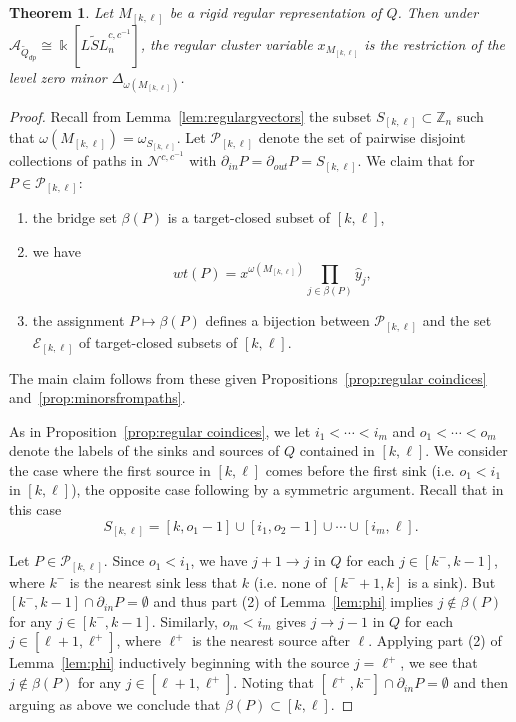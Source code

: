 \documentclass[12pt]{amsart}
\newcommand{\cA}{\mathcal{A}}
\newcommand{\ZZ}{\mathbb{Z}}
\newcommand{\kk}{\Bbbk}
\newcommand{\gv}{\omega}
\newcommand{\grep}{\gv}
\newcommand{\cE}{\mathcal{E}}
\newcommand{\cN}{\mathcal{N}} %
\newcommand{\cP}{\mathcal{P}}
\newcommand{\Qdp}{\widetilde{Q}_{dp}}
\newcommand{\Qrep}{M}
\newtheorem{theorem}{Theorem}[section]
\theoremstyle{remark}
\numberwithin{equation}{section}
\numberwithin{figure}{section}
\begin{document}
\begin{theorem}
\label{th:cluster character equals minor}
  Let $\Qrep_{[k,\ell]}$ be a rigid regular representation of $Q$.
  Then under $\cA_{\Qdp} \cong \kk[\widetilde{LSL}_n^{c,c^{-1}}]$, the regular cluster variable $x_{\Qrep_{[k,\ell]}}$ is the restriction of the level zero minor $\Delta_{\grep(\Qrep_{[k,\ell]})}$.
\end{theorem}
\begin{proof}
  Recall from Lemma~\ref{lem:regulargvectors} the subset $S_{[k,\ell]} \subset \ZZ_n$ such that $\grep(\Qrep_{[k,\ell]}) = \omega_{S_{[k,\ell]}}$.
  Let $\cP_{[k,\ell]}$ denote the set of pairwise disjoint collections of paths in $\cN^{c,c^{-1}}$ with $\partial_{in}P = \partial_{out}P = S_{[k,\ell]}$.
  We claim that for $P \in \cP_{[k,\ell]}$:
  \begin{enumerate}
    \item
      the bridge set $\beta(P)$ is a target-closed subset of $[k,\ell]$,
    \item
      we have
      \[
        wt(P) = x^{\grep(\Qrep_{[k,\ell]})} \prod_{j \in \beta(P)} \hat{y}_j,
      \]
    \item
      the assignment $P \mapsto \beta(P)$ defines a bijection between $\cP_{[k,\ell]}$ and the set $\cE_{[k,\ell]}$ of target-closed subsets of $[k,\ell]$.
  \end{enumerate}
  The main claim follows from these given Propositions~\ref{prop:regular coindices} and~\ref{prop:minorsfrompaths}.

  As in Proposition~\ref{prop:regular coindices}, we let $i_1 < \cdots < i_m$ and $o_1 < \cdots < o_m$ denote the labels of the sinks and sources of $Q$ contained in $[k,\ell]$.
  We consider the case where the first source in $[k,\ell]$ comes before the first sink (i.e. $o_1 < i_1$ in $[k,\ell]$), the opposite case following by a symmetric argument.
  Recall that in this case
  \[
    S_{[k,\ell]} = [k,o_1-1] \cup [i_1,o_2-1] \cup \cdots \cup [i_m,\ell].
  \]

  Let $P \in \cP_{[k,\ell]}$.
  Since $o_1<i_1$, we have $j+1\to j$ in $Q$ for each $j\in[k^-,k-1]$, where $k^-$ is the nearest sink less that $k$ (i.e. none of $[k^-+1,k]$ is a sink).
  But $[k^-,k-1]\cap\partial_{in}P=\emptyset$ and thus part (2) of Lemma~\ref{lem:phi} implies $j\notin\beta(P)$ for any $j\in[k^-,k-1]$.
  Similarly, $o_m<i_m$ gives $j\to j-1$ in $Q$ for each $j\in[\ell+1,\ell^+]$, where $\ell^+$ is the nearest source after $\ell$.
  Applying part (2) of Lemma~\ref{lem:phi} inductively beginning with the source $j=\ell^+$, we see that $j\notin\beta(P)$ for any $j\in[\ell+1,\ell^+]$.
  Noting that $[\ell^+,k^-]\cap\partial_{in}P=\emptyset$ and then arguing as above we conclude that $\beta(P)\subset[k,\ell]$.


\end{proof}
\end{document}
